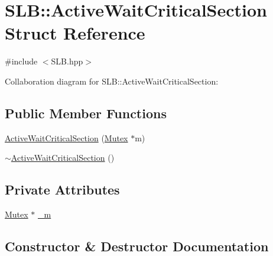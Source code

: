 \hypertarget{structSLB_1_1ActiveWaitCriticalSection}{}\section{S\+LB\+:\+:Active\+Wait\+Critical\+Section Struct Reference}
\label{structSLB_1_1ActiveWaitCriticalSection}


{\ttfamily \#include $<$S\+L\+B.\+hpp$>$}



Collaboration diagram for S\+LB\+:\+:Active\+Wait\+Critical\+Section\+:
\subsection*{Public Member Functions}
\begin{DoxyCompactItemize}
\item 
\hyperlink{structSLB_1_1ActiveWaitCriticalSection_af7999a780d6cef91b9d3d46f1428674b}{Active\+Wait\+Critical\+Section} (\hyperlink{structSLB_1_1Mutex}{Mutex} $\ast$m)
\item 
\hyperlink{structSLB_1_1ActiveWaitCriticalSection_ac0b237b0d5ce8bea93be1d400cf5453d}{$\sim$\+Active\+Wait\+Critical\+Section} ()
\end{DoxyCompactItemize}
\subsection*{Private Attributes}
\begin{DoxyCompactItemize}
\item 
\hyperlink{structSLB_1_1Mutex}{Mutex} $\ast$ \hyperlink{structSLB_1_1ActiveWaitCriticalSection_a3d1ad1e5d0b01dcea0f9e8d9807eae9f}{\+\_\+m}
\end{DoxyCompactItemize}


\subsection{Constructor \& Destructor Documentation}
